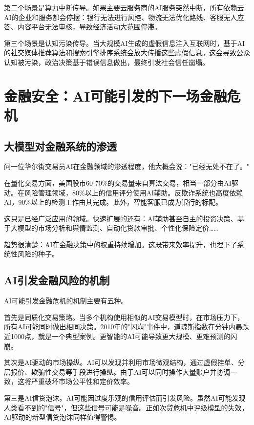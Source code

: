第二个场景是算力中断传导。如果主要云服务商的AI服务突然中断，所有依赖云AI的企业和服务都会停摆：银行无法进行风控、物流无法优化路线、客服无人应答、内容平台无法审核，导致经济活动大范围停滞。

第三个场景是认知污染传导。当大规模AI生成的虚假信息注入互联网时，基于AI的社交媒体推荐算法和搜索引擎排序系统会放大传播这些虚假信息。这会导致公众认知被污染，政治决策基于错误信息做出，最终引发社会信任崩塌。

\section{金融安全：AI可能引发的下一场金融危机}

\subsection{大模型对金融系统的渗透}

问一位华尔街交易员AI在金融领域的渗透程度，他大概会说："已经无处不在了。"

在量化交易方面，美国股市60-70\%的交易量来自算法交易，相当一部分由AI驱动。在风险管理领域，80\%以上的信用评分使用AI辅助。反欺诈系统也高度依赖AI，90\%以上的检测工作由其完成。此外，智能客服已成为银行的标配。

这只是已经广泛应用的领域。快速扩展的还有：AI辅助甚至自主的投资决策、基于大模型的市场分析和舆情监测、自动化贷款审批、个性化保险定价……

趋势很清楚：AI在金融决策中的权重持续增加。这既带来效率提升，也埋下了系统性风险的种子。

\subsection{AI引发金融风险的机制}

AI可能引发金融危机的机制主要有五种。

首先是同质化交易策略。当多个机构使用相似的AI交易模型时，在市场压力下，所有AI可能同时做出相同决策。2010年的"闪崩"事件中，道琼斯指数在分钟内暴跌近1000点，就是一个典型案例。更智能的AI可能导致更大规模、更难预测的闪崩。

其次是AI驱动的市场操纵。AI可以发现并利用市场微观结构，通过虚假挂单、分层报价、欺骗性交易等手段进行操纵。由于AI可以同时操作大量账户并协调一致，这将严重破坏市场公平性和定价效率。

第三是AI信贷泡沫。AI可能因过度乐观的信用评估而引发风险。虽然AI可能发现人类看不到的"信号"，但这些信号可能是噪音。正如次贷危机中评级模型的失效，AI驱动的新型信贷泡沫同样值得警惕。

